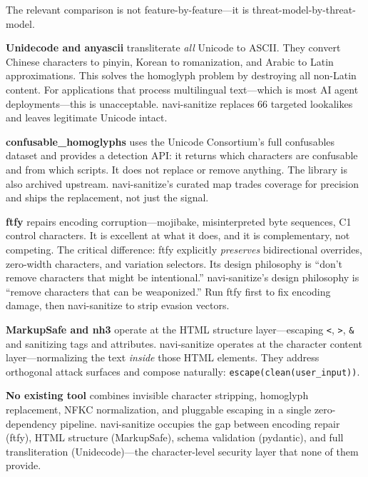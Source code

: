 \documentclass[11pt,letterpaper]{article}
\begin{document}
The relevant comparison is not feature-by-feature---it is threat-model-by-threat-model.

\textbf{Unidecode and anyascii} transliterate \emph{all} Unicode to ASCII. They convert Chinese characters to pinyin, Korean to romanization, and Arabic to Latin approximations. This solves the homoglyph problem by destroying all non-Latin content. For applications that process multilingual text---which is most AI agent deployments---this is unacceptable. navi-sanitize replaces 66 targeted lookalikes and leaves legitimate Unicode intact.

\textbf{confusable\_homoglyphs} uses the Unicode Consortium's full confusables dataset and provides a detection API: it returns which characters are confusable and from which scripts. It does not replace or remove anything. The library is also archived upstream. navi-sanitize's curated map trades coverage for precision and ships the replacement, not just the signal.

\textbf{ftfy} repairs encoding corruption---mojibake, misinterpreted byte sequences, C1 control characters. It is excellent at what it does, and it is complementary, not competing. The critical difference: ftfy explicitly \emph{preserves} bidirectional overrides, zero-width characters, and variation selectors. Its design philosophy is ``don't remove characters that might be intentional.'' navi-sanitize's design philosophy is ``remove characters that can be weaponized.'' Run ftfy first to fix encoding damage, then navi-sanitize to strip evasion vectors.

\textbf{MarkupSafe and nh3} operate at the HTML structure layer---escaping \texttt{<}, \texttt{>}, \texttt{\&} and sanitizing tags and attributes. navi-sanitize operates at the character content layer---normalizing the text \emph{inside} those HTML elements. They address orthogonal attack surfaces and compose naturally: \texttt{escape(clean(user\_input))}.

\textbf{No existing tool} combines invisible character stripping, homoglyph replacement, NFKC normalization, and pluggable escaping in a single zero-dependency pipeline. navi-sanitize occupies the gap between encoding repair (ftfy), HTML structure (MarkupSafe), schema validation (pydantic), and full transliteration (Unidecode)---the character-level security layer that none of them provide.

\end{document}
